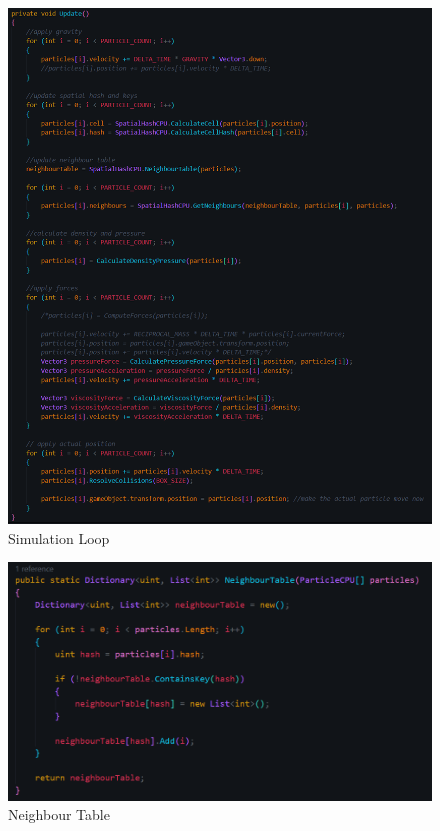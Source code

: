 \documentclass[a4paper, 12pt]{article}
\begin{document}
    \begin{figure}[H]
        \centering
        \includegraphics[width=\textwidth]{simulationLoopCPU.png}
        \caption{Simulation Loop}
    \end{figure}

    \begin{figure}[H]
        \centering
        \includegraphics[width=\textwidth]{neighbourTableCPU.png}
        \caption{Neighbour Table}
    \end{figure}
\end{document}
